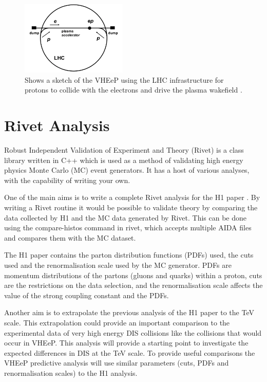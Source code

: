 \documentclass[journal, a4paper,11pt]{IEEEtran}
\begin{document}
\begin{figure}
\centering
		\includegraphics[width =0.45\textwidth]{VHEeP.png}
		\caption{Shows a sketch of the VHEeP using the LHC infrastructure for protons to collide with the electrons and drive the plasma wakefield \cite{VHEeP}.}
		\label{fig:VHEeP}
\end{figure}

\section{Rivet Analysis}

Robust Independent Validation of Experiment and Theory (Rivet) \cite{Rivet} is a class library written in C++ which is used as a method of validating high energy physics Monte Carlo (MC) event generators. It has a host of various analyses, with the capability of writing your own. 

One of the main aims is to write a complete Rivet analysis for the H1 paper \cite{H1}. By writing a Rivet routine it would be possible to validate theory by comparing the data collected by H1 and the MC data generated by Rivet. This can be done using the {\selectfont compare-histos} command in rivet, which accepts multiple AIDA files and compares them with the MC dataset.

The H1 paper contains the parton distribution functions (PDFs) used, the cuts used and the renormalisation scale used by the MC generator. PDFs are momentum distributions of the partons (gluons and quarks) within a proton, cuts are the restrictions on the data selection, and the renormalisation scale affects the value of the strong coupling constant and the PDFs. 

Another aim is to extrapolate the previous analysis of the H1 paper to the TeV scale. This extrapolation could provide an important comparison to the experimental data of very high energy DIS collisions like the collisions that would occur in VHEeP. This analysis will provide a starting point to investigate the expected differences in DIS at the TeV scale. To provide useful comparisons the VHEeP predictive analysis will use similar parameters (cuts, PDFs and renormalisation scales) to the H1 analysis.
\end{document}
